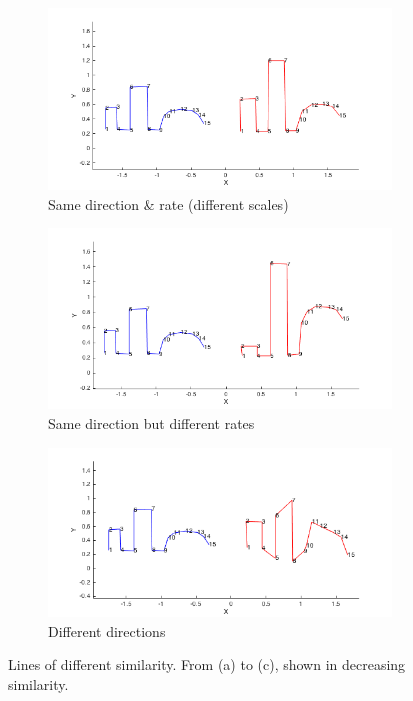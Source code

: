 \documentclass[
    floatsintext
]{article}
\begin{document}
\begin{figure}[h]
  \centering
  \begin{subfigure}{.49\textwidth}
    \includegraphics[width=1\linewidth]{./figures/similar_lines_A.png}
    \caption{Same direction \& rate (different scales)}
    \label{fig:similar_lines_A}
  \end{subfigure}
  \begin{subfigure}{.49\textwidth}
    \includegraphics[width=1\linewidth]{./figures/similar_lines_B.png}
    \caption{Same direction but different rates}
    \label{fig:similar_lines_B}
  \end{subfigure}
  \begin{subfigure}{.49\textwidth}
    \includegraphics[width=1\linewidth]{./figures/similar_lines_C.png}
    \caption{Different directions}
    \label{fig:similar_lines_C}
  \end{subfigure}
  \caption{Lines of different similarity. From (a) to (c), shown in decreasing similarity.}
\end{figure}
\end{document}
